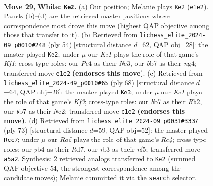 \documentclass[11pt]{article}
\begin{document}
\begin{figure}[p]
\label{fig:thought-m54}
\end{figure}

\clearpage

\begin{figure}[p]\centering
\begin{subfigure}{0.46\textwidth}\centering
\resizebox{\linewidth}{!}{%
\newchessgame
\chessboard[
  setfen={7k/1b1n1p1p/5rp1/R2Pp3/1p2P3/1r3PP1/7P/4K1NR w - - 0 29},
  showmover=false,
  pgfstyle=straightmove, color=movearrow, markmove={e1-e2}
]}
\caption{}
\end{subfigure}\hfill
\begin{subfigure}{0.46\textwidth}\centering
\resizebox{\linewidth}{!}{%
\newchessgame
\chessboard[
  setfen={8/1p3ppk/p3p2p/8/Pr4n1/2N1P1P1/1P1R1PP1/5K2 w - - 5 28},
  showmover=false,
  pgfstyle=straightmove, color=movearrow, markmove={f1-e2}
]}
\caption{}
\end{subfigure}
\\[4pt]
\begin{subfigure}{0.46\textwidth}\centering
\resizebox{\linewidth}{!}{%
\newchessgame
\chessboard[
  setfen={8/5k2/2n1pP2/p1Pp3p/rp1P4/5KP1/PRN2P2/8 w - - 1 35},
  showmover=false,
  pgfstyle=straightmove, color=movearrow, markmove={f3-e3}
]}
\caption{}
\end{subfigure}\hfill
\begin{subfigure}{0.46\textwidth}\centering
\resizebox{\linewidth}{!}{%
\newchessgame
\chessboard[
  setfen={8/1p1r2p1/1k3p2/2r1pN1P/6R1/1P1n2P1/P3RPK1/8 b - - 8 37},
  showmover=false,
  pgfstyle=straightmove, color=movearrow, markmove={c5-c7}
]}
\caption{}
\end{subfigure}
\caption{\textbf{Move 29, White: \texttt{Ke2}.} (a) Our position; Melanie plays \texttt{Ke2} (\texttt{e1e2}). Panels (b)--(d) are the retrieved master positions whose correspondence most drove this move (highest QAP objective among those that transfer to it). (b) Retrieved from \texttt{lichess\_elite\_2024-09\_p0010\#248} (ply 54) [structural distance $d$=62, QAP obj=28]: the master played \texttt{Ke2}; under $\mu$ our \emph{Ke1} plays the role of that game's \emph{Kf1}; cross-type roles: our \emph{P}e4 as their \emph{N}c3, our \emph{b}b7 as their \emph{n}g4; transferred move \texttt{e1e2} \textbf{(endorses this move)}. (c) Retrieved from \texttt{lichess\_elite\_2024-09\_p0010\#65} (ply 68) [structural distance $d$=64, QAP obj=26]: the master played \texttt{Ke3}; under $\mu$ our \emph{Ke1} plays the role of that game's \emph{Kf3}; cross-type roles: our \emph{b}b7 as their \emph{R}b2, our \emph{b}b7 as their \emph{N}c2; transferred move \texttt{e1e2} \textbf{(endorses this move)}. (d) Retrieved from \texttt{lichess\_elite\_2024-09\_p0031\#3337} (ply 73) [structural distance $d$=59, QAP obj=52]: the master played \texttt{Rcc7}; under $\mu$ our \emph{Ra5} plays the role of that game's \emph{Rc4}; cross-type roles: our \emph{p}b4 as their \emph{R}d7, our \emph{r}b3 as their \emph{n}f5; transferred move \texttt{a5a2}. Synthesis: 2 retrieved analogs transferred to \texttt{Ke2} (summed QAP objective 54, the strongest correspondence among the candidate moves); Melanie committed it via the \texttt{search} selector.}
\label{fig:thought-m56}
\end{figure}
\end{document}

